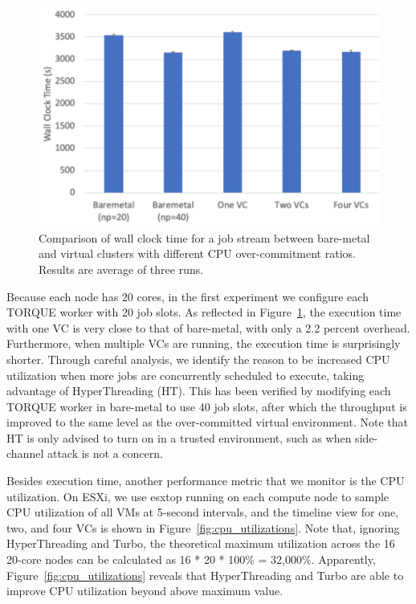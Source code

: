 \begin{figure}[!t]
   \begin{center}
       \includegraphics[width=0.8\columnwidth]{Figures/cpu_exe_time.pdf}
   \end{center}
   \caption{Comparison of wall clock time for a job stream between bare-metal and virtual clusters with different CPU over-commitment ratios. Results are average of three runs.}
   \label{fig:cpu_exe_time}
 \end{figure}

Because each node has 20 cores, in the first experiment we configure each TORQUE worker with 20 job slots. As reflected in Figure~\ref{fig:cpu_exe_time}, the execution time with one VC is very close to that of bare-metal, with only a 2.2 percent overhead. Furthermore, when multiple VCs are running, the execution time is surprisingly shorter. %
Through careful analysis, we identify the reason to be increased CPU utilization when more jobs are concurrently scheduled to execute, taking advantage of HyperThreading (HT). This has been verified by modifying each TORQUE worker in bare-metal to use 40 job slots, after which the throughput is improved to the same level as the over-committed virtual environment. Note that HT is only advised to turn on in a trusted environment, such as when side-channel attack is not a concern. 

Besides execution time, another performance metric that we monitor is the CPU utilization. On ESXi, we use esxtop running on each compute node to sample CPU utilization of all VMs at 5-second intervals, and the timeline view for one, two, and four VCs is shown in Figure~\ref{fig:cpu_utilizations}. 
Note that, ignoring HyperThreading and Turbo, the theoretical maximum utilization across the 16 20-core nodes can 
be calculated as 16 * 20 * 100\% = 32,000\%. Apparently, Figure~\ref{fig:cpu_utilizations} reveals that HyperThreading and Turbo 
are able to improve CPU utilization beyond above maximum value. 

